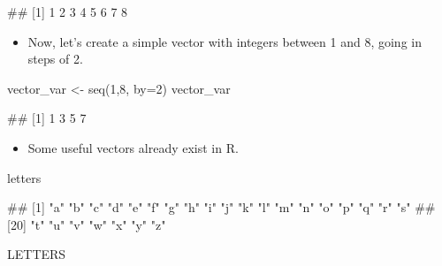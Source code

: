 \documentclass[
]{book}
\newenvironment{Shaded}{\begin{snugshade}}{\end{snugshade}}
\newcommand{\AttributeTok}[1]{\textcolor[rgb]{0.77,0.63,0.00}{#1}}
\newcommand{\DecValTok}[1]{\textcolor[rgb]{0.00,0.00,0.81}{#1}}
\newcommand{\FunctionTok}[1]{\textcolor[rgb]{0.00,0.00,0.00}{#1}}
\newcommand{\NormalTok}[1]{#1}
\newcommand{\OtherTok}[1]{\textcolor[rgb]{0.56,0.35,0.01}{#1}}
\providecommand{\tightlist}{%
  \setlength{\itemsep}{0pt}\setlength{\parskip}{0pt}}
\begin{document}
\begin{Shaded}
\begin{Highlighting}[]
\NormalTok{\#\# [1] 1 2 3 4 5 6 7 8}
\end{Highlighting}
\end{Shaded}

\begin{itemize}
\tightlist
\item
  Now, let's create a simple vector with integers between 1 and 8, going in steps of 2.
\end{itemize}

\begin{Shaded}
\begin{Highlighting}[]
\NormalTok{vector\_var }\OtherTok{\textless{}{-}} \FunctionTok{seq}\NormalTok{(}\DecValTok{1}\NormalTok{,}\DecValTok{8}\NormalTok{, }\AttributeTok{by=}\DecValTok{2}\NormalTok{)}
\NormalTok{vector\_var}
\end{Highlighting}
\end{Shaded}

\begin{Shaded}
\begin{Highlighting}[]
\NormalTok{\#\# [1] 1 3 5 7}
\end{Highlighting}
\end{Shaded}

\begin{itemize}
\tightlist
\item
  Some useful vectors already exist in R.
\end{itemize}

\begin{Shaded}
\begin{Highlighting}[]
\NormalTok{letters}
\end{Highlighting}
\end{Shaded}

\begin{Shaded}
\begin{Highlighting}[]
\NormalTok{\#\#  [1] "a" "b" "c" "d" "e" "f" "g" "h" "i" "j" "k" "l" "m" "n" "o" "p" "q" "r" "s"}
\NormalTok{\#\# [20] "t" "u" "v" "w" "x" "y" "z"}
\end{Highlighting}
\end{Shaded}

\begin{Shaded}
\begin{Highlighting}[]
\NormalTok{LETTERS}
\end{Highlighting}
\end{Shaded}
\end{document}
